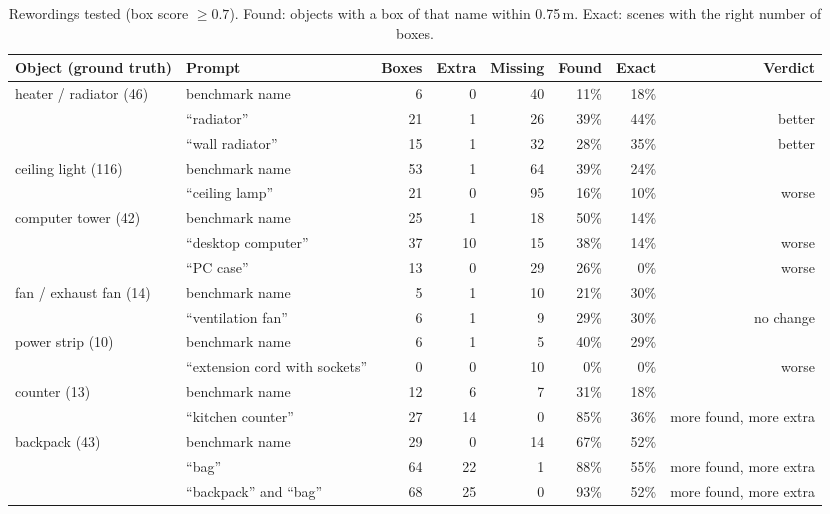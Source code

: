\begin{table}[t]
\centering
\caption{Rewordings tested (box score $\geq 0.7$). Found: objects with a box of that name within 0.75\,m.
Exact: scenes with the right number of boxes.}
\label{tab:sam3-a5}
\begin{tabular}{llrrrrrr}
\toprule
Object (ground truth) & Prompt & Boxes & Extra & Missing & Found & Exact & Verdict \\
\midrule
heater / radiator (46) & benchmark name            &  6 &  0 & 40 & 11\% & 18\% & \\
                       & ``radiator''              & 21 &  1 & 26 & 39\% & 44\% & better \\
                       & ``wall radiator''         & 15 &  1 & 32 & 28\% & 35\% & better \\
ceiling light (116)    & benchmark name            & 53 &  1 & 64 & 39\% & 24\% & \\
                       & ``ceiling lamp''          & 21 &  0 & 95 & 16\% & 10\% & worse \\
computer tower (42)    & benchmark name            & 25 &  1 & 18 & 50\% & 14\% & \\
                       & ``desktop computer''      & 37 & 10 & 15 & 38\% & 14\% & worse \\
                       & ``PC case''               & 13 &  0 & 29 & 26\% &  0\% & worse \\
fan / exhaust fan (14) & benchmark name            &  5 &  1 & 10 & 21\% & 30\% & \\
                       & ``ventilation fan''       &  6 &  1 &  9 & 29\% & 30\% & no change \\
power strip (10)       & benchmark name            &  6 &  1 &  5 & 40\% & 29\% & \\
                       & ``extension cord with sockets'' & 0 & 0 & 10 & 0\% & 0\% & worse \\
counter (13)           & benchmark name            & 12 &  6 &  7 & 31\% & 18\% & \\
                       & ``kitchen counter''       & 27 & 14 &  0 & 85\% & 36\% & more found, more extra \\
backpack (43)          & benchmark name            & 29 &  0 & 14 & 67\% & 52\% & \\
                       & ``bag''                   & 64 & 22 &  1 & 88\% & 55\% & more found, more extra \\
                       & ``backpack'' and ``bag''  & 68 & 25 &  0 & 93\% & 52\% & more found, more extra \\
\bottomrule
\end{tabular}
\end{table}

